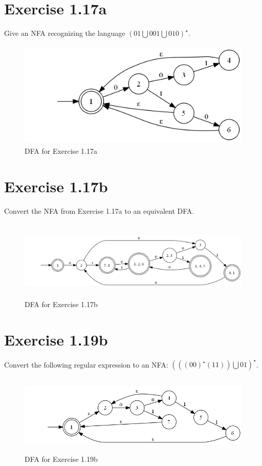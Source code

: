 \documentclass{article}
\newcommand{\union}{\bigcup}
\begin{document}
\section{Exercise 1.17a}

Give an NFA recognizing the language $(01 \union 001 \union 010)^\star$.

\begin{figure}[h!]
	\centering
	\includegraphics[height=2.0in]{1_17_a.png}
	\caption{DFA for Exercise 1.17a}
\end{figure}

\section{Exercise 1.17b}

Convert the NFA from Exercise 1.17a to an equivalent DFA.

\begin{figure}[h!]
	\centering
	\includegraphics[height=1.5in]{1_17_b.png}
	\caption{DFA for Exercise 1.17b}
\end{figure}

\section{Exercise 1.19b}

Convert the following regular expression to an NFA: $(((00)^\star (11)) \union
01)^\star$.

\begin{figure}[h!]
	\centering
	\includegraphics[height=1.5in]{1_19.png}
	\caption{DFA for Exercise 1.19b}
\end{figure}
\end{document}
